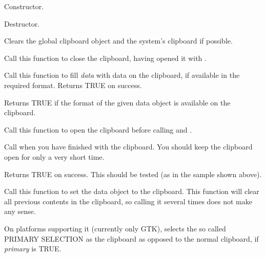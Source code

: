 
Constructor.



Destructor.

\label{wxclipboardclear}


Clears the global clipboard object and the system's clipboard if possible.

\label{wxclipboardclose}


Call this function to close the clipboard, having opened it with .

\label{wxclipboardgetdata}


Call this function to fill {\it data} with data on the clipboard, if available in the required
format. Returns TRUE on success.

\label{wxclipboardissupported}


Returns TRUE if the format of the given data object is available on the clipboard.

\label{wxclipboardopen}


Call this function to open the clipboard before calling  
and .

Call  when you have finished with the clipboard. You
should keep the clipboard open for only a very short time.

Returns TRUE on success. This should be tested (as in the sample shown above).

\label{wxclipboardsetdata}


Call this function to set the data object to the clipboard. This function will
clear all previous contents in the clipboard, so calling it several times
does not make any sense.

\label{wxclipboarduseprimary}


On platforms supporting it (currently only GTK), selects the so called
PRIMARY SELECTION as the clipboard as opposed to the normal clipboard,
if {\it primary} is TRUE.


